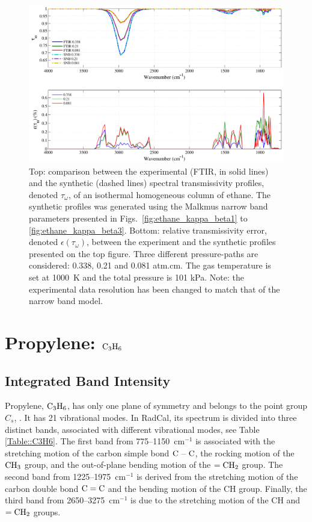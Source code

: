 \begin{figure}[p]
\includegraphics[width=\textwidth]{Figures/Comparison_Fit_Ethane_MALKMUS_Temp1000K.pdf}
\caption{Top: comparison between the experimental (FTIR, in solid lines) and the synthetic (dashed lines) spectral transmissivity profiles, denoted $\tau_{\omega}$, of an isothermal homogeneous column of ethane. The synthetic profiles was generated using the Malkmus narrow band parameters presented in Figs.~\ref{fig:ethane_kappa_beta1} to \ref{fig:ethane_kappa_beta3}. Bottom: relative transmissivity error, denoted $\epsilon{(\tau_{\omega})}$, between the experiment and the synthetic profiles presented on the top figure. Three different pressure-paths are considered: 0.338, 0.21 and 0.081 atm.cm. The gas temperature is set at 1000~K and the total pressure is 101 kPa. Note: the experimental data resolution has been changed to match that of the narrow band model. \label{fig:ethane_SNBVerify_1000K}}
\end{figure}


\clearpage

\section{Propylene: $\rm C_3H_6$}

\subsection{Integrated Band Intensity}

Propylene, $\rm C_3H_6$, has only one plane of symmetry and belongs to the point group $C_s$, \cite{Herzberg1949}. It has 21 vibrational modes. In RadCal, its spectrum is divided into three distinct bands, associated with different vibrational modes, see Table \ref{Table::C3H6}. The first band from 775--1150~cm$^{-1}$ is associated with the stretching motion of the carbon simple bond $\rm C-C$, the rocking motion of the $\rm CH_3$ group, and the out-of-plane bending motion of the $\rm = CH_2$ group. The second band from 1225--1975~cm$^{-1}$ is derived from the stretching motion of the carbon double bond $\rm C=C$ and the bending motion of the CH group. Finally, the third band from 2650--3275~cm$^{-1}$ is due to the stretching motion of the CH and $\rm = CH_2$ groups.

